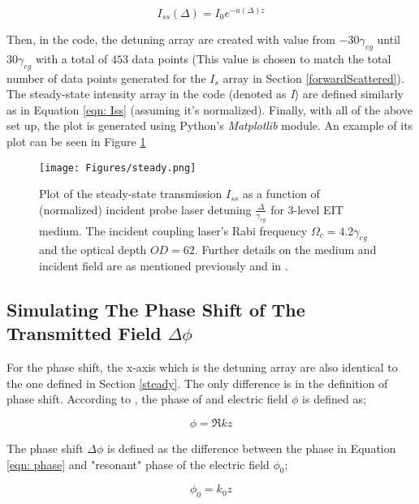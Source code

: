 \begin{equation}
    I_{ss}(\Delta) = I_{0} e^{-a(\Delta) z}
    \label{eqn: Iss}
\end{equation}

Then, in the code, the detuning array are created with value from $-30\gamma_{eg}$ until $30\gamma_{eg}$ with a total of $453$ data points (This value is chosen to match the total number of data points generated for the $I_{s}$ array in Section \ref{forwardScattered}). The steady-state intensity array in the code (denoted as \textit{I}) are defined similarly as in Equation \ref{eqn: Iss} (assuming it's normalized). Finally, with all of the above set up, the plot is generated using Python's \textit{Matplotlib} module. An example of its plot can be seen in Figure \ref{fig: steady}

\begin{figure}
    \centering
    \texttt{[image: Figures/steady.png]}
    \caption[Plot of Steady-State Transmission As A Function of Incident Probe Laser Detuning]{Plot of the steady-state transmission $I_{ss}$ as a function of (normalized) incident probe laser detuning $\frac{\Delta}{\gamma_{eg}}$ for 3-level EIT medium. The incident coupling laser's Rabi frequency $\Omega_{c} = 4.2\gamma_{eg}$ and the optical depth $OD = 62$. Further details on the medium and incident field are as mentioned previously and in \protect{}.}
    \label{fig: steady}
\end{figure}

\subsection{Simulating The Phase Shift of The Transmitted Field $\Delta\phi$}
For the phase shift, the x-axis which is the detuning array are also identical to the one defined in Section \ref{steady}. The only difference is in the definition of phase shift. According to , the phase of and electric field $\phi$ is defined as;

\begin{equation}
    \phi = \Re{k} z
    \label{eqn: phase}
\end{equation}

The phase shift $\Delta\phi$ is defined as the difference between the phase in Equation \ref{eqn: phase} and "resonant" phase of the electric field $\phi_{0}$;

\begin{equation}
    \phi_{0} = k_{0}z
\end{equation}


